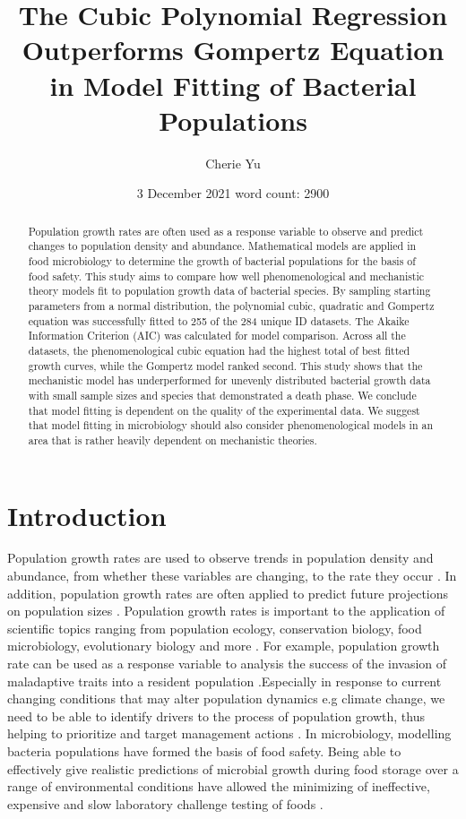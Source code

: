 \documentclass[11pt]{article}
\title{The Cubic Polynomial Regression Outperforms Gompertz Equation in Model Fitting of Bacterial Populations}
\author{Cherie Yu}
\affil{Imperial College London}
\date{3 December 2021\hspace*{3cm} word count: 2900}
\begin{document}
\maketitle

\pagebreak
\begin{abstract}
    Population growth rates are often used as a response variable to observe and predict changes to 
    population density and abundance. Mathematical models are applied in food microbiology to 
    determine the growth of bacterial populations for the basis of food safety. This study aims 
    to compare how well phenomenological and mechanistic theory models fit to population growth data 
    of bacterial species. By sampling starting parameters from a normal distribution, the polynomial 
    cubic, quadratic and Gompertz equation was successfully fitted to 255 of the 284 unique ID datasets. 
    The Akaike Information Criterion (AIC) was calculated for model comparison. Across all the datasets, 
    the phenomenological cubic equation had the highest total of best fitted growth curves, while 
    the Gompertz model ranked second. This study shows that the mechanistic model has underperformed 
    for unevenly distributed bacterial growth data with small sample sizes and species that demonstrated 
    a death phase. We conclude that model fitting is dependent on the quality of the 
    experimental data. We suggest that model fitting in microbiology should also consider 
    phenomenological models in an area that is rather heavily dependent on mechanistic theories. 
\end{abstract}

\section{Introduction}

\linenumbers
Population growth rates are used to observe trends in population density and abundance, from 
whether these variables are changing, to the rate they occur \cite{sibly_population_2002}. In addition, population 
growth rates are often applied to predict future projections on population sizes \cite{sibly_population_2002}. Population 
growth rates is important to the application of scientific topics ranging from population ecology, 
conservation biology, food microbiology, evolutionary biology and more \cite{sibly_population_2002,sibly_population_2002-1}. For example, 
population growth rate can be used as a response variable to analysis the success of the invasion 
of maladaptive traits into a resident population \cite{sibly_population_2002-1}.Especially in response to current changing 
conditions that may alter population dynamics e.g climate change, we need to be able to identify 
drivers to the process of population growth, thus helping to prioritize and target management actions \cite{eacker_assessing_2017}. 
In microbiology, modelling bacteria populations have formed the basis of food safety. Being able 
to effectively give realistic predictions of microbial growth during food storage over a range of 
environmental conditions have allowed the minimizing of ineffective, expensive and slow laboratory 
challenge testing of foods \cite{soboleva_predictive_2000,baranyi_mathematics_1995,perni_estimating_2005}. 
\end{document}
